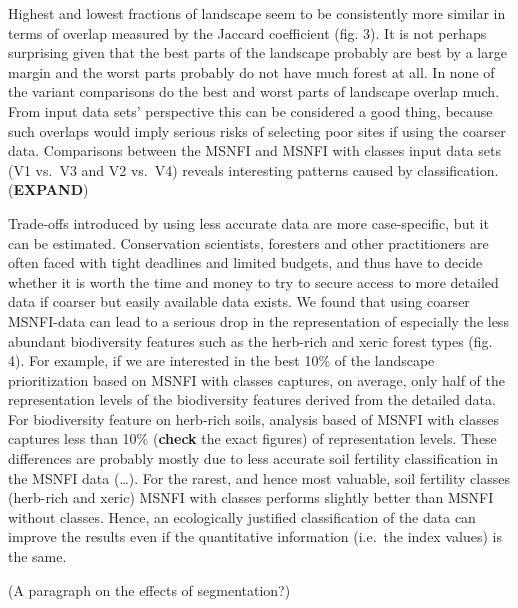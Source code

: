 \documentclass[]{article}
\begin{document}
Highest and lowest fractions of landscape seem to be consistently more
similar in terms of overlap measured by the Jaccard coefficient (fig.
3). It is not perhaps surprising given that the best parts of the
landscape probably are best by a large margin and the worst parts
probably do not have much forest at all. In none of the variant
comparisons do the best and worst parts of landscape overlap much. From
input data sets' perspective this can be considered a good thing,
because such overlaps would imply serious risks of selecting poor sites
if using the coarser data. Comparisons between the MSNFI and MSNFI with
classes input data sets (V1 vs.~V3 and V2 vs.~V4) reveals interesting
patterns caused by classification. (\textbf{EXPAND})

Trade-offs introduced by using less accurate data are more
case-specific, but it can be estimated. Conservation scientists,
foresters and other practitioners are often faced with tight deadlines
and limited budgets, and thus have to decide whether it is worth the
time and money to try to secure access to more detailed data if coarser
but easily available data exists. We found that using coarser MSNFI-data
can lead to a serious drop in the representation of especially the less
abundant biodiversity features such as the herb-rich and xeric forest
types (fig. 4). For example, if we are interested in the best 10\% of
the landscape prioritization based on MSNFI with classes captures, on
average, only half of the representation levels of the biodiversity
features derived from the detailed data. For biodiversity feature on
herb-rich soils, analysis based of MSNFI with classes captures less than
10\% (\textbf{check} the exact figures) of representation levels. These
differences are probably mostly due to less accurate soil fertility
classification in the MSNFI data (\ldots{}). For the rarest, and hence
most valuable, soil fertility classes (herb-rich and xeric) MSNFI with
classes performs slightly better than MSNFI without classes. Hence, an
ecologically justified classification of the data can improve the
results even if the quantitative information (i.e.~the index values) is
the same.

(A paragraph on the effects of segmentation?)
\end{document}

